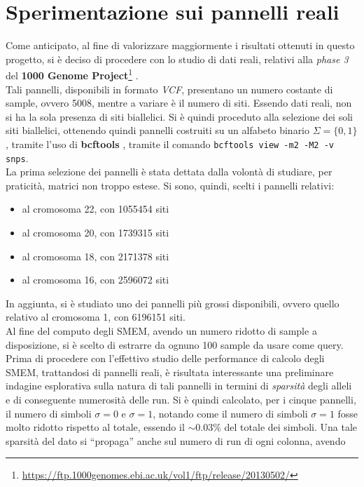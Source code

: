 \section{Sperimentazione sui pannelli reali}
Come anticipato, al fine di valorizzare maggiormente i risultati ottenuti in
questo progetto, si 
è deciso di procedere con lo studio di dati reali, relativi alla \textit{phase
  3} del \textbf{1000
  Genome
  Project}\footnote{\url{https://ftp.1000genomes.ebi.ac.uk/vol1/ftp/release/20130502/}}
\cite{1kgp}.\\ 
Tali pannelli, disponibili in formato \textit{VCF}, presentano un numero
costante di sample, ovvero 5008, mentre a variare è il numero di siti. Essendo
dati reali, non si ha la sola presenza di siti biallelici. Si è quindi proceduto
alla selezione dei soli siti biallelici, ottenendo quindi pannelli costruiti su
un alfabeto binario $\Sigma=\{0,1\}$, tramite l'uso di \textbf{bcftools}
\cite{bcftools}, tramite il comando \texttt{bcftools view -m2 -M2
  -v snps}.\\
La prima selezione dei pannelli è stata dettata dalla volontà di studiare, per
praticità, matrici non troppo estese. Si sono, quindi, scelti i pannelli
relativi:
\begin{itemize}
  \item al cromosoma 22, con 1055454 siti
  \item al cromosoma 20, con 1739315 siti
  \item al cromosoma 18, con 2171378 siti
  \item al cromosoma 16, con 2596072 siti
\end{itemize}
In aggiunta, si è studiato uno dei pannelli più grossi disponibili, ovvero
quello relativo al cromosoma 1, con 6196151 siti.\\
Al fine del computo degli SMEM, avendo un numero ridotto di sample a
disposizione, si è scelto di estrarre da ognuno 100 sample da usare come
query.\\
Prima di procedere con l'effettivo studio delle performance di calcolo degli
SMEM, trattandosi di pannelli reali, è risultata interessante una preliminare
indagine esplorativa sulla natura di tali pannelli in termini di
\textit{sparsità} degli alleli e di conseguente numerosità delle run. Si è
quindi calcolato, per i cinque pannelli, il numero di simboli $\sigma=0$ e
$\sigma=1$, notando come il numero di simboli $\sigma=1$ fosse molto ridotto
rispetto al totale, essendo il $\sim 0.03\%$ del totale dei simboli. Una tale
sparsità del dato si ``propaga'' anche sul numero di run di ogni colonna, avendo
